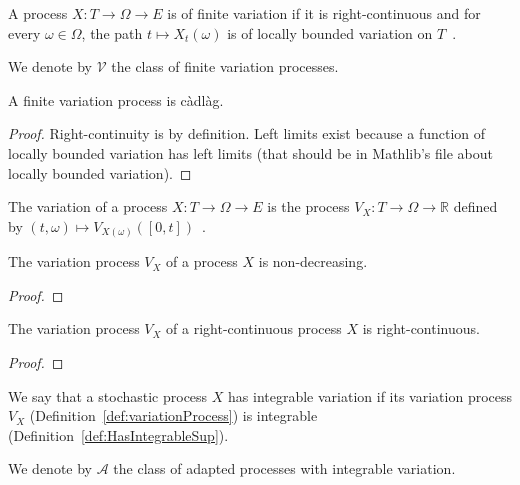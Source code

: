 \begin{definition}\label{def:HasFiniteVariation}
A process $X : T \to \Omega \to E$ is of finite variation if it is right-continuous and for every $\omega \in \Omega$, the path $t \mapsto X_t(\omega)$ is of locally bounded variation on $T$~.

We denote by $\mathcal{V}$ the class of finite variation processes.
\end{definition}


\begin{lemma}\label{lem:HasFiniteVariation.isCadlag}
A finite variation process is càdlàg.
\end{lemma}

\begin{proof}
Right-continuity is by definition. Left limits exist because a function of locally bounded variation has left limits (that should be in Mathlib's file about locally bounded variation).
\end{proof}


\begin{definition}\label{def:variationProcess}
The variation of a process $X : T \to \Omega \to E$ is the process $V_X : T \to \Omega \to \mathbb{R}$ defined by $(t, \omega) \mapsto V_{X(\omega)}([0,t])$~.
\end{definition}


\begin{lemma}\label{lem:monotone_variationProcess}
The variation process $V_X$ of a process $X$ is non-decreasing.
\end{lemma}

\begin{proof}

\end{proof}


\begin{lemma}\label{lem:rightContinuous_variationProcess}
The variation process $V_X$ of a right-continuous process $X$ is right-continuous.
\end{lemma}

\begin{proof}

\end{proof}


\begin{definition}\label{def:HasIntegrableVariation}
We say that a stochastic process $X$ has integrable variation if its variation process $V_X$ (Definition~\ref{def:variationProcess}) is integrable (Definition~\ref{def:HasIntegrableSup}).

We denote by $\mathcal{A}$ the class of adapted processes with integrable variation.
\end{definition}

